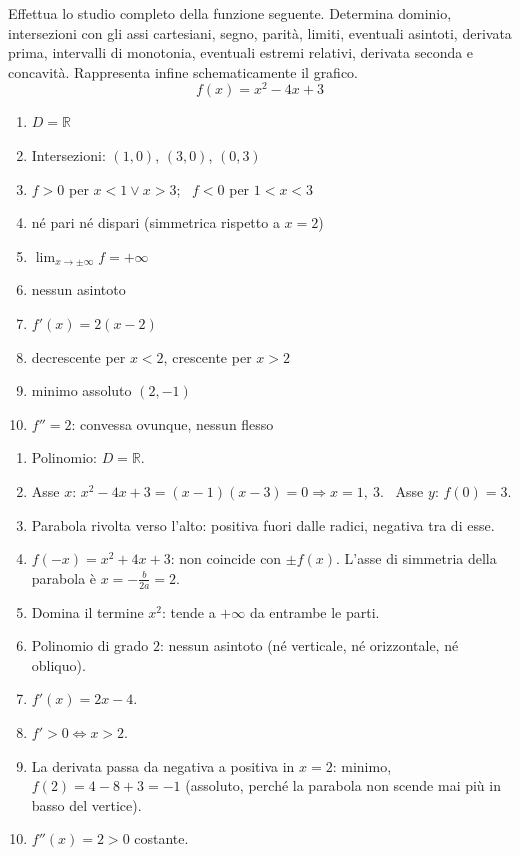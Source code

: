 \begin{question}[ID=2.1, subtitle={Studio completo di una funzione polinomiale}, difficulty=facile, tags={funzioni, studio di funzione, polinomi}]
Effettua lo studio completo della funzione seguente. Determina dominio, intersezioni con gli assi cartesiani, segno, parità, limiti, eventuali asintoti, derivata prima, intervalli di monotonia, eventuali estremi relativi, derivata seconda e concavità. Rappresenta infine schematicamente il grafico.
\begin{equation*}
    f(x)=x^2-4x+3
\end{equation*}
\begin{solution}
\begin{enumerate}
    \item $D=\mathbb{R}$
    \item Intersezioni: $(1,0)$, $(3,0)$, $(0,3)$
    \item $f>0$ per $x<1\vee x>3$; \ $f<0$ per $1<x<3$
    \item né pari né dispari (simmetrica rispetto a $x=2$)
    \item $\lim_{x\to\pm\infty}f=+\infty$
    \item nessun asintoto
    \item $f'(x)=2(x-2)$
    \item decrescente per $x<2$, crescente per $x>2$
    \item minimo assoluto $(2,-1)$
    \item $f''=2$: convessa ovunque, nessun flesso
\end{enumerate}
\end{solution}
\begin{explanation}
\begin{enumerate}
    \item Polinomio: $D=\mathbb{R}$.
    \item Asse $x$: $x^2-4x+3=(x-1)(x-3)=0 \Rightarrow x=1,\ 3$. \ Asse $y$: $f(0)=3$.
    \item Parabola rivolta verso l'alto: positiva fuori dalle radici, negativa tra di esse.
    \item $f(-x)=x^2+4x+3$: non coincide con $\pm f(x)$. L'asse di simmetria della parabola è $x=-\tfrac{b}{2a}=2$.
    \item Domina il termine $x^2$: tende a $+\infty$ da entrambe le parti.
    \item Polinomio di grado $2$: nessun asintoto (né verticale, né orizzontale, né obliquo).
    \item $f'(x)=2x-4$.
    \item $f'>0 \iff x>2$.
    \item La derivata passa da negativa a positiva in $x=2$: minimo, $f(2)=4-8+3=-1$ (assoluto, perché la parabola non scende mai più in basso del vertice).
    \item $f''(x)=2>0$ costante.
\end{enumerate}
\end{explanation}
\end{question}

